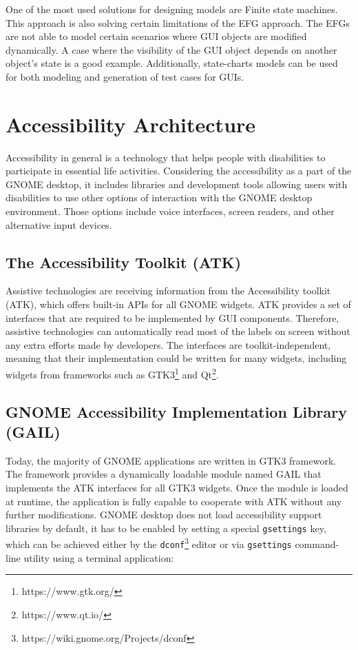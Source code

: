 One of the most used solutions for designing models are Finite state machines. This approach is also solving certain limitations of the EFG approach. The EFGs are not able to model certain scenarios where GUI objects are modified dynamically. A case where the visibility of the GUI object depends on another object's state is a good example. Additionally, state-charts models can be used for both modeling and generation of test cases for GUIs.\cite{patternbasedtesting}


\chapter{Accessibility Architecture}
Accessibility in general is a technology that helps people with disabilities to participate in essential life activities. Considering the accessibility as a part of the GNOME desktop, it includes libraries and development tools allowing users with disabilities to use other options of interaction with the GNOME desktop environment. Those options include voice interfaces, screen readers, and other alternative input devices.\cite{gnomeADG}
\section{The Accessibility Toolkit (ATK)}
Assistive technologies are receiving information from the Accessibility toolkit (ATK), which offers built-in APIs for all GNOME widgets. ATK provides a set of interfaces that are required to be implemented by GUI components. Therefore, assistive technologies can automatically read most of the labels on screen without any extra efforts made by developers. The interfaces are toolkit-independent, meaning that their implementation could be written for many widgets, including widgets from frameworks such as GTK3\footnote{https://www.gtk.org/} and Qt\footnote{https://www.qt.io/}.
\section{GNOME Accessibility Implementation Library (GAIL)}
Today, the majority of GNOME applications are written in GTK3 framework. The framework provides a dynamically loadable module named GAIL that implements the ATK interfaces for all GTK3 widgets. Once the module is loaded at runtime, the application is fully capable to cooperate with ATK without any further modifications.
GNOME desktop does not load accessibility support libraries by default, it has to be enabled by setting a special \texttt{gsettings} key, which can be achieved either by the \texttt{dconf}\footnote{https://wiki.gnome.org/Projects/dconf} editor or via \texttt{gsettings} command-line utility using a terminal application:

